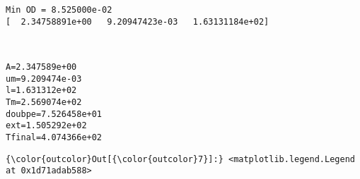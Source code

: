 \documentclass[11pt]{article}
\begin{document}
    \begin{Verbatim}[commandchars=\\\{\}]
Min OD = 8.525000e-02
[  2.34758891e+00   9.20947423e-03   1.63131184e+02]

    \end{Verbatim}

    \begin{center}
    \end{center}
    { \hspace*{\fill} \\}
    
    \begin{Verbatim}[commandchars=\\\{\}]
A=2.347589e+00
um=9.209474e-03
l=1.631312e+02
Tm=2.569074e+02
doubpe=7.526458e+01
ext=1.505292e+02
Tfinal=4.074366e+02

    \end{Verbatim}

            \begin{Verbatim}[commandchars=\\\{\}]
{\color{outcolor}Out[{\color{outcolor}7}]:} <matplotlib.legend.Legend at 0x1d71adab588>
\end{Verbatim}
        
    \begin{center}
    \end{center}
    { \hspace*{\fill} \\}
    
    \begin{center}
    \end{center}
    { \hspace*{\fill} \\}
    
\end{document}
